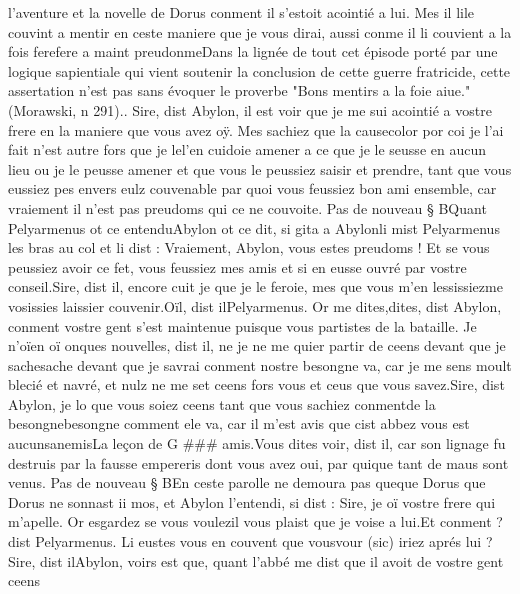 \documentclass{article}
\begin{document}
\begin{pages}
   l’aventure et la novelle de 
      Dorus conment il s’estoit acointié a lui.
   Mes il lile couvint 
   a mentir en ceste maniere que je vous dirai, 
   aussi conme il li couvient a la fois 
   ferefere a maint preudonmeDans la lignée de
   tout cet épisode porté par une logique sapientiale qui vient soutenir la conclusion de cette guerre fratricide, cette assertation 
   n'est pas sans évoquer le proverbe "Bons mentirs a la foie aiue." (Morawski, n 291)..
   Sire, dist Abylon, il est voir que je me sui acointié a 
      vostre frere en la maniere que vous avez oÿ. Mes sachiez que la 
      causecolor por coi je l’ai fait 
      n’est autre fors que je lel'en cuidoie amener a ce que je le seusse en 
      aucun lieu ou je le peusse amener et que vous le peussiez saisir 
   et prendre, tant que vous eussiez pes envers eulz couvenable par quoi vous feussiez bon ami 
      ensemble, car vraiement il n’est pas preudoms qui ce ne couvoite. \pend
\pstart Pas de nouveau § BQuant 
   Pelyarmenus ot ce entenduAbylon ot ce dit, 
   si gita a Abylonli mist Pelyarmenus 
   les bras au col et li dist :
   Vraiement, Abylon, vous estes preudoms ! 
   Et se vous peussiez avoir ce fet, vous feussiez mes amis et si en eusse ouvré par vostre conseil.Sire, dist il, encore cuit je que je le feroie, mes que vous 
      m’en lessissiezme vosissies laissier couvenir.Oïl, dist ilPelyarmenus. Or me 
      dites,dites, dist Abylon, 
      conment vostre gent s’est maintenue puisque vous partistes de la bataille.
      Je n’oïen oï onques nouvelles, dist il, 
      ne je ne me quier partir de ceens devant que je 
      sachesache devant que je savrai 
      conment nostre besongne va, car je me sens moult blecié et navré, 
   et nulz ne me set ceens fors vous et ceus que vous savez.Sire, dist Abylon, je lo que vous soiez ceens 
      tant que vous sachiez conmentde la 
      besongnebesongne comment ele va, car il m’est avis que 
      cist abbez vous est 
      aucunsanemisLa leçon de G ### 
      amis.Vous dites voir, dist il, car son lignage fu destruis par 
      la fausse empereris dont vous avez oui, 
      par quique tant de maus sont venus. \pend
\pstart Pas de nouveau § BEn ceste parolle ne demoura pas 
   queque Dorus que Dorus
   ne sonnast ii mos, et Abylon 
   l’entendi, si dist :
   Sire, je oï vostre frere qui m’apelle. 
      Or esgardez se 
      vous voulezil vous plaist que je voise a lui.Et conment ? dist Pelyarmenus. 
      Li eustes vous en couvent que 
      vousvour (sic) iriez aprés lui ?Sire, dist ilAbylon, voirs est que, 
      quant l’abbé me dist que il avoit de vostre gent ceens 

\end{pages}
\end{document}
